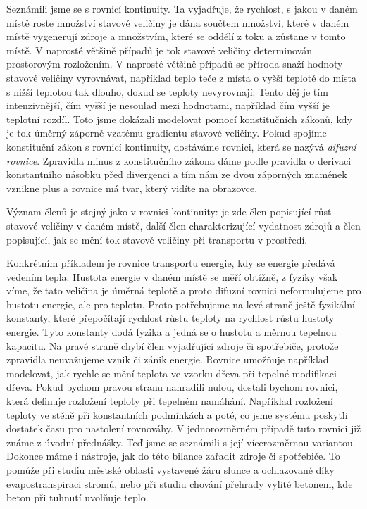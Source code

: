 \documentclass[12pt]{article}
\begin{document}
Seznámili jsme se s rovnicí kontinuity. Ta vyjadřuje, že rychlost, s jakou v daném místě roste množství stavové veličiny je dána součtem množství, které v daném místě vygenerují zdroje a množstvím, které se oddělí z toku a zůstane v tomto místě. 
V naprosté většině případů je tok stavové veličiny determinován prostorovým rozložením. V naprosté většině případů se příroda snaží hodnoty stavové veličiny vyrovnávat, například teplo teče z místa o vyšší teplotě do místa s nižší teplotou tak dlouho, dokud se teploty nevyrovnají. Tento děj je tím intenzivnější, čím vyšší je nesoulad mezi hodnotami, například čím vyšší je teplotní rozdíl. Toto jsme dokázali modelovat pomocí konstitučních zákonů, kdy je tok úměrný záporně vzatému gradientu stavové veličiny. Pokud spojíme konstituční zákon s rovnicí kontinuity, dostáváme rovnici, která se nazývá \textit{difuzní rovnice}. Zpravidla minus z konstitučního zákona dáme podle pravidla o derivaci konstantního násobku před divergenci a tím nám ze dvou záporných znamének vznikne plus a rovnice má tvar, který vidíte na obrazovce.

Význam členů je stejný jako v rovnici kontinuity: je zde člen popisující růst stavové veličiny v daném místě, další člen charakterizující vydatnost zdrojů a člen popisující, jak se mění tok stavové veličiny při transportu v prostředí.

Konkrétním příkladem je rovnice transportu energie, kdy se energie předává vedením tepla. Hustota energie v daném místě se měří obtížně, z fyziky však víme, že tato veličina je úměrná teplotě a proto difuzní rovnici neformulujeme pro hustotu energie, ale pro teplotu. Proto potřebujeme na levé straně ještě fyzikální konstanty, které přepočítají rychlost růstu teploty na rychlost růstu hustoty energie. Tyto konstanty dodá fyzika a jedná se o hustotu a měrnou tepelnou kapacitu. Na pravé straně chybí člen vyjadřující zdroje či spotřebiče, protože zpravidla neuvažujeme vznik či zánik energie. Rovnice umožňuje například modelovat, jak rychle se mění teplota ve vzorku dřeva při tepelné modifikaci dřeva. Pokud bychom pravou stranu nahradili nulou, dostali bychom rovnici, která definuje rozložení teploty při tepelném namáhání. Například rozložení teploty ve stěně při konstantních podmínkách a poté, co jsme systému poskytli dostatek času pro nastolení rovnováhy. V jednorozměrném případě tuto rovnici již známe z úvodní přednášky. Teď jsme se seznámili s její vícerozměrnou variantou. Dokonce máme i nástroje, jak do této bilance zařadit zdroje či spotřebiče. To pomůže při studiu městské oblasti vystavené žáru slunce a ochlazované díky evapostranspiraci stromů, nebo při studiu chování přehrady vylité betonem, kde beton při tuhnutí uvolňuje teplo.
\end{document}

